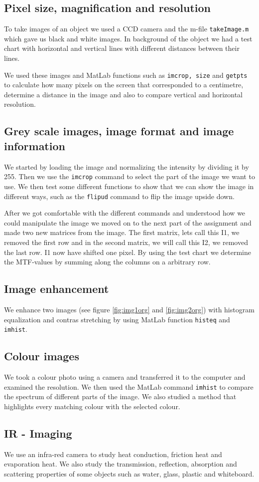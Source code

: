\subsection{Pixel size, magnification and resolution}
To take images of an object we used a CCD camera and the m-file \texttt{takeImage.m} which gave us black and white images. In background of the object we had a test chart with horizontal and vertical lines with different distances between their lines. 

We used these images and MatLab functions such as \texttt{imcrop, size} and \texttt{getpts} to calculate how many pixels on the screen that corresponded to a centimetre, determine a distance in the image and also to compare vertical and horizontal resolution. 

\subsection{Grey scale images, image format and image information}
We started by loading the image and normalizing the intensity by dividing it by 255. Then we use the \texttt{imcrop} command to select the part of the image we want to use. We then test some different functions to show that we can show the image in different ways, such as the \texttt{flipud} command to flip the image upside down. 

After we got comfortable with the different commands and understood how we could manipulate the image we moved on to the next part of the assignment and made two new matrices from the image. The first matrix, lets call this I1, we removed the first row and in the second matrix, we will call this I2, we removed the last row. I1 now have shifted one pixel.
By using the test chart we determine the MTF-values by summing along the columns on a arbitrary row.

\subsection{Image enhancement}
We enhance two images (see figure \ref{fig:img1org} and \ref{fig:img2org}) with histogram equalization and contras stretching by using MatLab function \texttt{histeq} and \texttt{imhist}. 

\subsection{Colour images}
We took a colour photo using a camera and transferred it to the computer and examined the resolution. We then used the MatLab command \texttt{imhist} to compare the spectrum of different parts of the image. %
We also studied a method that highlights every matching colour with the selected colour.

\subsection{IR - Imaging}
We use an infra-red camera to study heat conduction, friction heat and evaporation heat. We also study the transmission, reflection, absorption and scattering properties of some objects such as water, glass, plastic and whiteboard.
